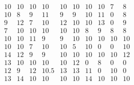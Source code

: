 \documentclass[12pt,oneside,a4paper]{article}
\begin{document}
  \begin{equation}
    \tag{Mean Tabu duration by city table 8}
    \begin{smallmatrix} 10 & 10 & 10 & 10 & 10 & 10 & 10 & 10 & 7 & 8 \\
                    10 & 8 & 9 & 11 & 9 & 9 & 10 & 11 & 0 & 8 \\
                    9 & 12 & 7 & 10 & 12 & 10 & 10 & 13 & 0 & 9\\
                    7 & 10 & 10 & 10 & 10 & 10 & 8 & 9 & 8 & 8 \\
                    10 & 10 & 11 & 9 & 9 & 10 & 10 & 10 & 10 & 10 \\
                    10 & 10 & 7 & 10 & 10 & 5 & 10 & 0 & 0 & 10\\
                    14 & 12 & 9 & 9 & 10 & 10 & 10 & 10 & 10 & 12 \\
                    13 & 10 & 10 & 10 & 10 & 12 & 0 & 8 & 0 & 0\\
                    12 & 9 & 12 & 10.5 & 13 & 13 & 11 & 0 & 10 & 0 \\
                    13 & 14 & 10 & 10 & 10 & 10 & 14 & 10 & 10 & 10
    \end{smallmatrix}
  \end{equation}
\end{document}
